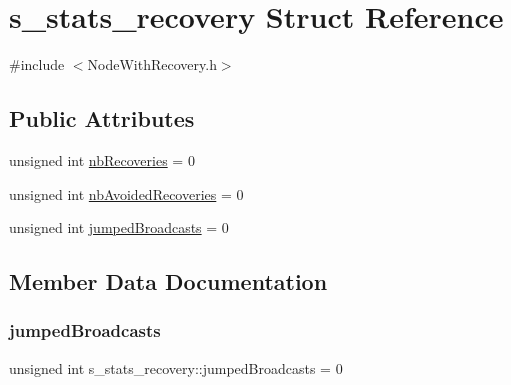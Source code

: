 \hypertarget{structs__stats__recovery}{}\section{s\+\_\+stats\+\_\+recovery Struct Reference}
\label{structs__stats__recovery}


{\ttfamily \#include $<$Node\+With\+Recovery.\+h$>$}

\subsection*{Public Attributes}
\begin{DoxyCompactItemize}
\item 
unsigned int \hyperlink{structs__stats__recovery_a89b2e116cf913c2939d186a2cd4f865b}{nb\+Recoveries} = 0
\item 
unsigned int \hyperlink{structs__stats__recovery_a0f21481940b624e49b0880d1bbf3df33}{nb\+Avoided\+Recoveries} = 0
\item 
unsigned int \hyperlink{structs__stats__recovery_ad4ca0f06d00b8cb3a6998977ea146e10}{jumped\+Broadcasts} = 0
\end{DoxyCompactItemize}


\subsection{Member Data Documentation}
\mbox{\label{structs__stats__recovery_ad4ca0f06d00b8cb3a6998977ea146e10}} 
\subsubsection{\texorpdfstring{jumped\+Broadcasts}{jumpedBroadcasts}}
{\footnotesize\ttfamily unsigned int s\+\_\+stats\+\_\+recovery\+::jumped\+Broadcasts = 0}

\mbox{\label{structs__stats__recovery_a0f21481940b624e49b0880d1bbf3df33}} 
